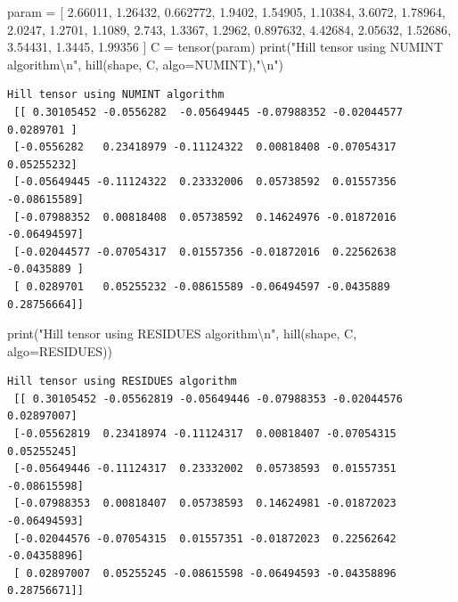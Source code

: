 \documentclass[
  letterpaper,
  DIV=11,
  numbers=noendperiod]{scrreprt}
\newenvironment{Shaded}{\begin{snugshade}}{\end{snugshade}}
\newcommand{\BuiltInTok}[1]{\textcolor[rgb]{0.00,0.23,0.31}{#1}}
\newcommand{\CharTok}[1]{\textcolor[rgb]{0.13,0.47,0.30}{#1}}
\newcommand{\FloatTok}[1]{\textcolor[rgb]{0.68,0.00,0.00}{#1}}
\newcommand{\NormalTok}[1]{\textcolor[rgb]{0.00,0.23,0.31}{#1}}
\newcommand{\OperatorTok}[1]{\textcolor[rgb]{0.37,0.37,0.37}{#1}}
\newcommand{\StringTok}[1]{\textcolor[rgb]{0.13,0.47,0.30}{#1}}
\begin{document}
\begin{Shaded}
\begin{Highlighting}[]
\NormalTok{param }\OperatorTok{=}\NormalTok{ [ }\FloatTok{2.66011}\NormalTok{, }\FloatTok{1.26432}\NormalTok{, }\FloatTok{0.662772}\NormalTok{, }\FloatTok{1.9402}\NormalTok{, }\FloatTok{1.54905}\NormalTok{, }\FloatTok{1.10384}\NormalTok{, }\FloatTok{3.6072}\NormalTok{, }\FloatTok{1.78964}\NormalTok{, }\FloatTok{2.0247}\NormalTok{, }\FloatTok{1.2701}\NormalTok{, }\FloatTok{1.1089}\NormalTok{, }\FloatTok{2.743}\NormalTok{, }\FloatTok{1.3367}\NormalTok{, }\FloatTok{1.2962}\NormalTok{, }\FloatTok{0.897632}\NormalTok{, }\FloatTok{4.42684}\NormalTok{, }\FloatTok{2.05632}\NormalTok{, }\FloatTok{1.52686}\NormalTok{, }\FloatTok{3.54431}\NormalTok{, }\FloatTok{1.3445}\NormalTok{, }\FloatTok{1.99356}\NormalTok{ ]}
\NormalTok{C }\OperatorTok{=}\NormalTok{ tensor(param)}
\BuiltInTok{print}\NormalTok{(}\StringTok{"Hill tensor using NUMINT algorithm}\CharTok{\textbackslash{}n}\StringTok{"}\NormalTok{, hill(shape, C, algo}\OperatorTok{=}\NormalTok{NUMINT),}\StringTok{"}\CharTok{\textbackslash{}n}\StringTok{"}\NormalTok{)}
\end{Highlighting}
\end{Shaded}

\begin{verbatim}
Hill tensor using NUMINT algorithm
 [[ 0.30105452 -0.0556282  -0.05649445 -0.07988352 -0.02044577  0.0289701 ]
 [-0.0556282   0.23418979 -0.11124322  0.00818408 -0.07054317  0.05255232]
 [-0.05649445 -0.11124322  0.23332006  0.05738592  0.01557356 -0.08615589]
 [-0.07988352  0.00818408  0.05738592  0.14624976 -0.01872016 -0.06494597]
 [-0.02044577 -0.07054317  0.01557356 -0.01872016  0.22562638 -0.0435889 ]
 [ 0.0289701   0.05255232 -0.08615589 -0.06494597 -0.0435889   0.28756664]] 
\end{verbatim}

\begin{Shaded}
\begin{Highlighting}[]
\BuiltInTok{print}\NormalTok{(}\StringTok{"Hill tensor using RESIDUES algorithm}\CharTok{\textbackslash{}n}\StringTok{"}\NormalTok{, hill(shape, C, algo}\OperatorTok{=}\NormalTok{RESIDUES))}
\end{Highlighting}
\end{Shaded}

\begin{verbatim}
Hill tensor using RESIDUES algorithm
 [[ 0.30105452 -0.05562819 -0.05649446 -0.07988353 -0.02044576  0.02897007]
 [-0.05562819  0.23418974 -0.11124317  0.00818407 -0.07054315  0.05255245]
 [-0.05649446 -0.11124317  0.23332002  0.05738593  0.01557351 -0.08615598]
 [-0.07988353  0.00818407  0.05738593  0.14624981 -0.01872023 -0.06494593]
 [-0.02044576 -0.07054315  0.01557351 -0.01872023  0.22562642 -0.04358896]
 [ 0.02897007  0.05255245 -0.08615598 -0.06494593 -0.04358896  0.28756671]]
\end{verbatim}
\end{document}
